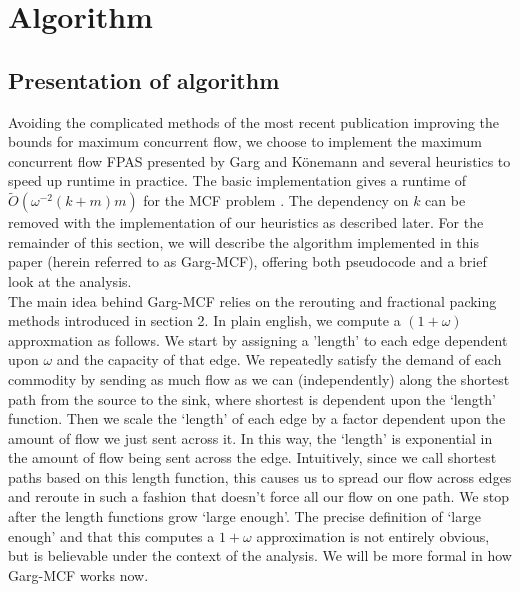 \section{Algorithm}
\subsection{Presentation of algorithm}
Avoiding the complicated methods of the most recent publication
improving the bounds for maximum concurrent flow, we choose to
implement the maximum concurrent flow FPAS presented by Garg and
K\"{o}nemann and several heuristics to speed up runtime in
practice. The basic implementation gives a runtime of
$\tilde{O}(\omega^{-2}(k+m)m)$ for the MCF problem \cite{garg}. The dependency on $k$
can be removed with
the implementation of our heuristics as described later. For the
remainder of this section, we will describe the algorithm implemented
in this paper (herein referred to as Garg-MCF), offering both
pseudocode and a brief look at the analysis. \\
The main idea behind Garg-MCF relies on the rerouting and fractional
packing methods introduced in section 2. In plain english, we compute a $(1+\omega)$ approxmation as follows. We start by assigning a 'length' to each edge
dependent upon $\omega$ and
the capacity of that edge. We repeatedly satisfy the
demand of each commodity by sending as much flow as we can
(independently) along the
shortest path from the source to the sink, where shortest is dependent
upon the `length' function. Then we scale the `length' of each edge by
a factor dependent upon the amount of flow we just sent across it. In
this way, the `length' is exponential in the amount of flow being sent
across the edge. Intuitively, since we call shortest paths based on
this length function, this causes us to spread our flow across edges
and reroute in such a fashion that doesn't force all our flow on one
path. We stop after the length functions grow `large enough'. The
precise definition of `large enough' and that this computes a $1+\omega$ approximation is not
entirely obvious, but is believable under the context of the
analysis. We will be more formal in how Garg-MCF works
now.

